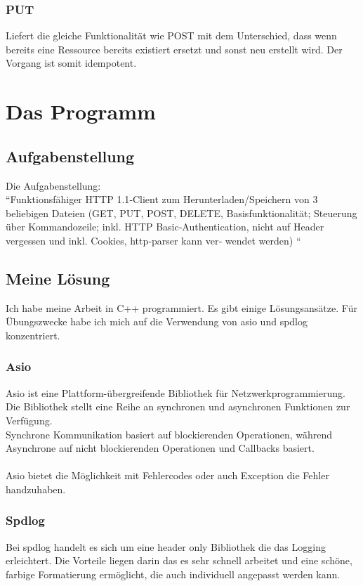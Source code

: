 \documentclass{article}
\begin{document}
\subsubsection{PUT}
Liefert die gleiche Funktionalität wie POST mit dem Unterschied, dass wenn bereits eine Ressource bereits existiert ersetzt und sonst neu erstellt wird. Der Vorgang ist somit idempotent.

\section{Das Programm}
\subsection{Aufgabenstellung}
Die Aufgabenstellung: \\

``Funktionsfähiger HTTP 1.1‐Client zum Herunterladen/Speichern von 3 
beliebigen Dateien (GET, PUT, POST, DELETE, Basisfunktionalität;
Steuerung über Kommandozeile; inkl. HTTP Basic‐Authentication,
nicht auf Header vergessen und inkl. Cookies, http‐parser kann ver‐
wendet werden)
``

\subsection{Meine Lösung}
Ich habe meine Arbeit in C++ programmiert. Es gibt einige Lösungsansätze. Für Übungszwecke habe ich mich auf die Verwendung von asio und spdlog konzentriert. 

\subsubsection{Asio}
Asio ist eine Plattform-übergreifende Bibliothek für Netzwerkprogrammierung. Die Bibliothek stellt eine Reihe an synchronen und asynchronen Funktionen
zur Verfügung. 
\\
Synchrone Kommunikation basiert auf blockierenden Operationen, während Asynchrone auf nicht blockierenden Operationen und Callbacks basiert.
\\
\\
Asio bietet die Möglichkeit mit Fehlercodes oder auch Exception die Fehler handzuhaben. 

\subsubsection{Spdlog}
Bei spdlog handelt es sich um eine header only Bibliothek die das Logging erleichtert. Die Vorteile liegen darin das es sehr schnell arbeitet und eine schöne, farbige Formatierung ermöglicht, die auch individuell angepasst werden kann.  
\end{document}
